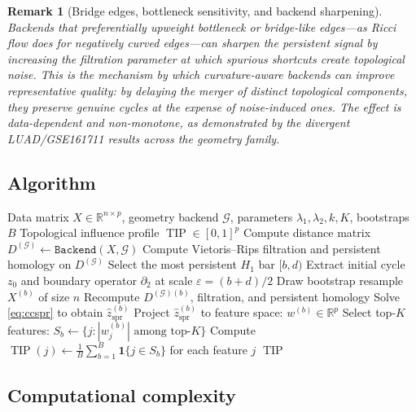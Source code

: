\documentclass[11pt]{article}
\newtheorem{remark}[theorem]{Remark}
\DeclareMathOperator{\TIP}{TIP}
\begin{document}
\begin{remark}[Bridge edges, bottleneck sensitivity, and backend sharpening]\label{rem:bridge}
Backends that preferentially upweight bottleneck or bridge-like edges---as Ricci flow does for negatively curved edges---can sharpen the persistent signal by increasing the filtration parameter at which spurious shortcuts create topological noise.
This is the mechanism by which curvature-aware backends can improve representative quality: by delaying the merger of distinct topological components, they preserve genuine cycles at the expense of noise-induced ones.
The effect is data-dependent and non-monotone, as demonstrated by the divergent LUAD/GSE161711 results across the geometry family.
\end{remark}

\subsection{Algorithm}

\begin{algorithm}[h]
\caption{CC-SPR Pipeline}
\label{alg:ccspr}
\begin{algorithmic}[1]
\REQUIRE Data matrix $X \in \mathbb{R}^{n \times p}$, geometry backend $\mathcal{G}$, parameters $\lambda_1, \lambda_2, k, K$, bootstraps $B$
\ENSURE Topological influence profile $\TIP \in [0,1]^p$
\STATE Compute distance matrix $D^{(\mathcal{G})} \gets \texttt{Backend}(X, \mathcal{G})$
\STATE Compute Vietoris--Rips filtration and persistent homology on $D^{(\mathcal{G})}$
\STATE Select the most persistent $H_1$ bar $[b, d)$
\STATE Extract initial cycle $z_0$ and boundary operator $\partial_2$ at scale $\varepsilon = (b + d)/2$
    \STATE Draw bootstrap resample $X^{(b)}$ of size $n$
    \STATE Recompute $D^{(\mathcal{G})(b)}$, filtration, and persistent homology
    \STATE Solve \eqref{eq:ccspr} to obtain $\hat{z}_{\mathrm{spr}}^{(b)}$
    \STATE Project $\hat{z}_{\mathrm{spr}}^{(b)}$ to feature space: $w^{(b)} \in \mathbb{R}^p$
    \STATE Select top-$K$ features: $S_b \gets \{j : |w^{(b)}_j| \text{ among top-}K\}$
\ENDFOR
\STATE Compute $\TIP(j) \gets \frac{1}{B} \sum_{b=1}^B \mathbf{1}\{j \in S_b\}$ for each feature $j$
\RETURN $\TIP$
\end{algorithmic}
\end{algorithm}

\subsection{Computational complexity}
\end{document}
